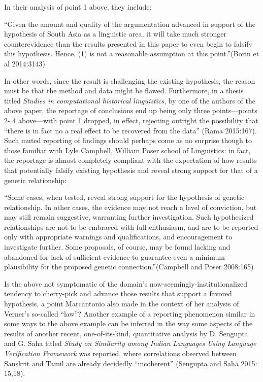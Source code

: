 In their analysis of point 1 above, they include:

\begin{myquote}
“Given the amount and quality of the argumentation advanced in support of the hypothesis of South Asia as a linguistic area, it will take much stronger counterevidence than the results presented in this paper to even begin to falsify this hypothesis. Hence, (1) is not a reasonable assumption at this point.”\hfill (Borin et al 2014:3143)
\end{myquote}

In other words, since the result is challenging the existing hypothesis, the reason must be that the method and data might be flawed. Furthermore, in a thesis titled \textit{Studies in computational historical linguistics}, by one of the authors of the above paper, the reportage of conclusions end up being only three points—points 2- 4 above—with point 1 dropped, in effect, rejecting outright the possibility that “there is in fact no a real effect to be recovered from the data” (Rama 2015:167). Such muted reporting of findings should perhaps come as no surprise though to those familiar with Lyle Campbell, William Poser school of Linguistics: in fact, the reportage is almost completely compliant with the expectation of how results that potentially falsify existing hypothesis and reveal strong support for that of a genetic relationship:

\begin{myquote}
“Some cases, when tested, reveal strong support for the hypothesis of genetic relationship. In other cases, the evidence may not reach a level of conviction, but may still remain suggestive, warranting further investigation. Such hypothesized relationships are not to be embraced with full enthusiasm, and are to be reported only with appropriate warnings and qualifications, and encouragement to investigate further. Some proposals, of course, may be found lacking and abandoned for lack of sufficient evidence to guarantee even a minimum plausibility for the proposed genetic connection.”\hfill (Campbell and Poser 2008:165)
\end{myquote}

Is the above not symptomatic of the domain’s now-seemingly-institutionalized tendency to cherry-pick and advance those results that support a favored hypothesis, a point Marcantonio also made in the context of her analysis of Verner’s so-called “law”? Another example of a reporting phenomenon similar in some ways to the above example can be inferred in the way some aspects of the results of another recent, one-of-its-kind, quantitative analysis by D. Sengupta and G. Saha titled \textit{Study on Similarity among Indian Languages Using Language Verification Framework} was reported, where correlations observed between Sanskrit and Tamil are already decidedly “incoherent” (Sengupta and Saha 2015: 15,18).


